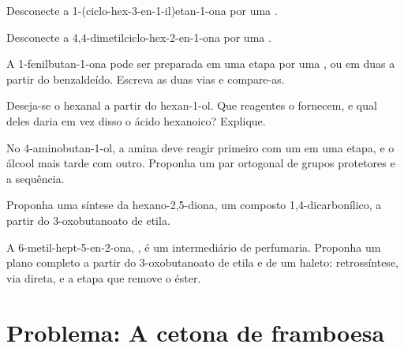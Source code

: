 \begin{exercise}[$\star\star$]\label{exo:b2:retrosynthesis:6}
Desconecte a 1-(ciclo-hex-3-en-1-il)etan-1-ona por uma .
\end{exercise}

\begin{exercise}[$\star\star$]\label{exo:b2:retrosynthesis:7}
Desconecte a 4,4-dimetilciclo-hex-2-en-1-ona por uma .
\end{exercise}

\begin{exercise}[$\star\star$]\label{exo:b2:retrosynthesis:8}
A 1-fenilbutan-1-ona pode ser preparada em uma etapa por uma , ou em duas a
partir do benzaldeído. Escreva as duas vias e compare-as.
\end{exercise}

\begin{exercise}[$\star\star$]\label{exo:b2:retrosynthesis:9}
Deseja-se o hexanal a partir do hexan-1-ol. Que reagentes o fornecem, e qual deles daria em vez disso o
ácido hexanoico? Explique.
\end{exercise}

\begin{exercise}[$\star\star\star$]\label{exo:b2:retrosynthesis:10}
No 4-aminobutan-1-ol, a amina deve reagir primeiro com um  em uma etapa, e o álcool
mais tarde com outro. Proponha um par ortogonal de grupos protetores e a sequência.
\end{exercise}

\begin{exercise}[$\star\star\star$]\label{exo:b2:retrosynthesis:11}
Proponha uma síntese da hexano-2,5-diona, um composto 1,4-dicarbonílico, a partir do 3-oxobutanoato de etila.
\end{exercise}

\begin{exercise}[$\star\star\star$]\label{exo:b2:retrosynthesis:12}
A 6-metil-hept-5-en-2-ona, , é um intermediário de perfumaria. Proponha um
plano completo a partir do 3-oxobutanoato de etila e de um haleto: retrossíntese, via direta, e a etapa
que remove o éster.
\end{exercise}

\section{Problema: A cetona de framboesa}


